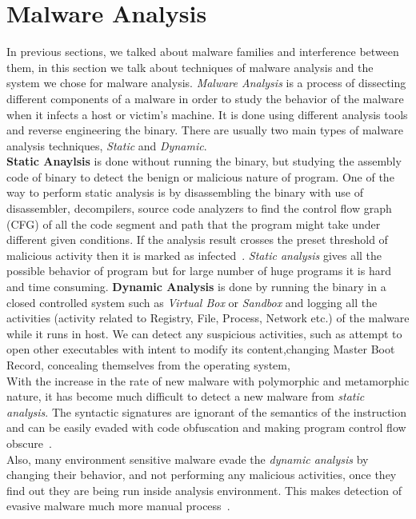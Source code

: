 \section{Malware Analysis}
\label{sec:Malware Analysis}
In previous sections, we talked about malware families and interference between them, in this section we talk about techniques of malware analysis and the system we chose for malware analysis.
\emph{Malware Analysis} is a process of dissecting different components of a malware in order to study the behavior of the malware when it infects a host or victim's machine.
It is done using different analysis tools and reverse engineering the binary.
There are usually two main types of malware analysis techniques, \emph{Static} and \emph{Dynamic}.\\
\textbf{Static Anaylsis} is done without running the binary, but studying the assembly code of binary to detect the benign or malicious nature of program.
One of the way to perform static analysis is by disassembling the binary with use of disassembler, decompilers, source code analyzers to find the control flow graph (CFG) of all the code segment and path that the program might take under different given conditions.
If the analysis result crosses the preset threshold of malicious activity then it is marked as infected~\cite[]{sharma2014}.
\emph{Static analysis} gives all the possible behavior of program but for large number of huge programs it is hard and time consuming.
\textbf{Dynamic Analysis} is done by running the binary in a closed controlled system such as \emph{Virtual Box} or \emph{Sandbox} and logging all the activities (activity related to Registry, File, Process, Network etc.) of the malware while it runs in host.
We can detect any suspicious activities, such as attempt to open other executables with intent to modify its content,changing Master Boot Record, concealing themselves from the operating system,
\\
With the increase in the rate of new malware with polymorphic and metamorphic nature, it has become much difficult to detect a new malware from \emph{static analysis}.
The syntactic signatures are ignorant of the semantics of the instruction and can be easily evaded with code obfuscation and making program control flow obscure~\cite[]{staticlimit}.\\
Also, many environment sensitive malware evade the \emph{dynamic analysis} by changing their behavior, and not performing any malicious activities, once they find out they are being run inside analysis environment.
This makes detection of evasive malware much more manual process~\cite[]{barecloud}.

